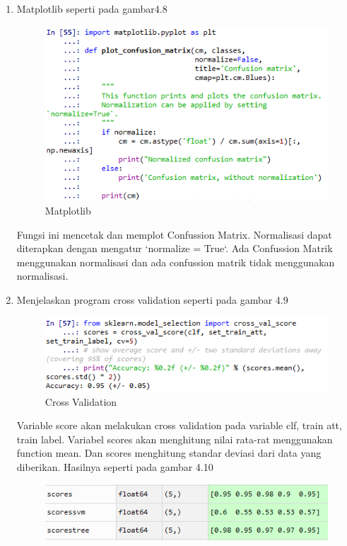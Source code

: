 \begin{enumerate}
\begin{itemize}
\end{itemize}
\item Matplotlib seperti pada gambar4.8
\begin{figure}[ht]
\centering
\includegraphics[scale=0.9]{figures/pandas/4_9.png}
\caption{Matplotlib}
\end{figure}
\par Fungsi ini mencetak dan memplot Confussion Matrix. Normalisasi dapat diterapkan dengan mengatur `normalize = True`. Ada Confussion Matrik menggunakan normalisasi dan ada confussion matrik tidak menggunakan normalisasi.
\item Menjelaskan program cross validation seperti pada gambar 4.9
\begin{figure}[ht]
\centering
\includegraphics[scale=0.9]{figures/pandas/4_10.png}
\caption{Cross Validation}
\end{figure}
\par Variable score akan melakukan cross validation pada variable clf, train att, train label. Variabel scores akan menghitung nilai rata-rat menggunakan function mean. Dan scores menghitung standar deviasi dari data yang diberikan. Hasilnya seperti pada gambar 4.10
\begin{figure}[ht]
\centering
\includegraphics[scale=0.9]{figures/pandas/4_11.png}

\end{figure}
\end{enumerate}
